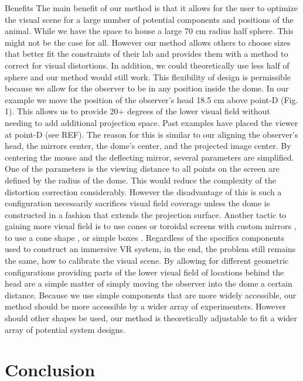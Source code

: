 \documentclass[10pt,letterpaper]{article}
\begin{document}
Benefits
The main benefit of our method is that it allows for the user to optimize the
visual scene for a large number of potential components and positions of the
animal.  While we have the space to house a large 70 cm radius half sphere.
This might not be the case for all. However our method allows others to choose
sizes that better fit the constraints of their lab and provides them with a
method to correct for visual distortions. In addition, we could theoretically
use less half of sphere and our method would still work. This flexibility of
design is permissible because we allow for the observer to be in any position
inside the dome. In our example we move the position of the observer’s head
18.5 cm above point-D (Fig. 1). This allows us to provide 20+ degrees of the
lower visual field without needing to add additional projection space. Past
examples have placed the viewer at point-D (see REF). The reason for this is
similar to our aligning the observer’s head, the mirrors center, the dome’s
center, and the projected image center. By centering the mouse and the
deflecting mirror, several parameters are simplified. One of the parameters is
the viewing distance to all points on the screen are defined by the radius of
the dome. This would reduce the complexity of the distortion correction
considerably. However the disadvantage of this is such a configuration
necessarily sacrifices visual field coverage unless the dome is constructed in
a fashion that extends the projection surface. Another tactic to gaining more
visual field is to use cones or toroidal screens with custom mirrors
\cite{holscher2005rats, harvey2009intracellular}, to use a cone shape
\cite{aronov2014engagement}, or simple boxes \cite{aghajan2015impaired}.
Regardless of the specifics components used to construct an immersive VR
system, in the end, the problem still remains the same, how to calibrate the
visual scene. By allowing for different geometric configurations providing
parts of the lower visual field of locations behind the head are a simple
matter of simply moving the observer into the dome a certain distance. Because
we use simple components that are more widely accessible, our method should be
more accessible by a wider array of experimenters. However should other shapes
be used, our method is theoretically adjustable to fit a wider array of
potential system designs.

\section*{Conclusion}
\end{document}
